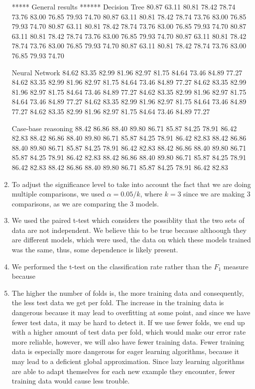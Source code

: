 \documentclass[a4paper,12pt,oneside,final]{report}
\begin{document}
\begin{enumerate}
\begin{tabular}{llll}
\end{tabular}


***** General results ******
Decision Tree
80.87 63.11 80.81 78.42 78.74 73.76 83.00 76.85 79.93 74.70 
80.87 63.11 80.81 78.42 78.74 73.76 83.00 76.85 79.93 74.70 
80.87 63.11 80.81 78.42 78.74 73.76 83.00 76.85 79.93 74.70 
80.87 63.11 80.81 78.42 78.74 73.76 83.00 76.85 79.93 74.70 
80.87 63.11 80.81 78.42 78.74 73.76 83.00 76.85 79.93 74.70 
80.87 63.11 80.81 78.42 78.74 73.76 83.00 76.85 79.93 74.70 

Neural Network
84.62 83.35 82.99 81.96 82.97 81.75 84.64 73.46 84.89 77.27 
84.62 83.35 82.99 81.96 82.97 81.75 84.64 73.46 84.89 77.27 
84.62 83.35 82.99 81.96 82.97 81.75 84.64 73.46 84.89 77.27 
84.62 83.35 82.99 81.96 82.97 81.75 84.64 73.46 84.89 77.27 
84.62 83.35 82.99 81.96 82.97 81.75 84.64 73.46 84.89 77.27 
84.62 83.35 82.99 81.96 82.97 81.75 84.64 73.46 84.89 77.27 

Case-base reasoning
88.42  86.86  88.40  89.80  86.71  85.87  84.25  78.91  86.42  82.83 
88.42  86.86  88.40  89.80  86.71  85.87  84.25  78.91  86.42  82.83 
88.42  86.86  88.40  89.80  86.71  85.87  84.25  78.91  86.42  82.83 
88.42  86.86  88.40  89.80  86.71  85.87  84.25  78.91  86.42  82.83 
88.42  86.86  88.40  89.80  86.71  85.87  84.25  78.91  86.42  82.83 
88.42  86.86  88.40  89.80  86.71  85.87  84.25  78.91  86.42  82.83 


\item To adjust the significance level to take into account the fact that we are doing multiple comparisons, we used $\alpha = 0.05 / k$, where $k = 3$ since we are making 3 comparisons, as we are comparing the 3 models.
\item We used the paired t-test which considers the possiblity that the two sets of data are not independent.  We believe this to be true because althoough they are different models, which were used, the data on which these models trained was the same, thus, some dependence is likely present.
\item We performed the t-test on the classification rate rather than the $F_1$ measure because 

\item The higher the number of folds is, the more training data and consequently, the less test data we get per fold. 
    The increase in the training data is dangerous because it may lead to overfitting at some point,
    and since we have fewer test data, it may be hard to detect it. If we use fewer folds, we end up 
    with a higher amount of test data per fold, which would make our error rate more reliable, however, we 
    will also have fewer training data. Fewer training data is especially more dangerous for eager learning
    algorithms, because it may lead to a deficient global approximation. Since lazy learning algorithms are able to adapt
    themselves for each new example they encounter, fewer training data would cause less trouble.


\end{enumerate}
\end{document}
